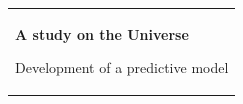 %
\begin{titlepage}
\vspace*{\fill}
  \addtolength{\hoffset}{0.5\evensidemargin-0.5\oddsidemargin} %
  \noindent%
  {\color{white}\colorbox{aaublue}{\begin{tabular}{@{}p{\textwidth}@{}}
    \begin{center}
    \Huge{\textbf{
      A study on the Universe%
    }}
    \end{center}
    \begin{center}
      \Large{
        Development of a predictive model%
}
\end{center}
\end{tabular}}}
\end{titlepage}
